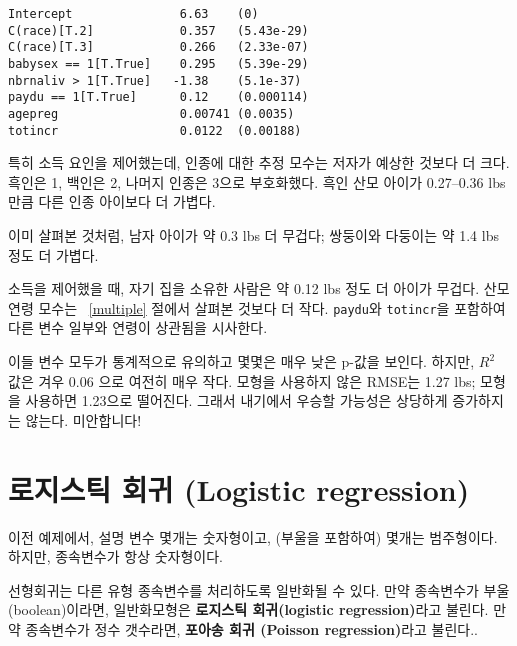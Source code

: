 \begin{verbatim}
Intercept               6.63    (0)
C(race)[T.2]            0.357   (5.43e-29)
C(race)[T.3]            0.266   (2.33e-07)
babysex == 1[T.True]    0.295   (5.39e-29)
nbrnaliv > 1[T.True]   -1.38    (5.1e-37)
paydu == 1[T.True]      0.12    (0.000114)
agepreg                 0.00741 (0.0035)
totincr                 0.0122  (0.00188)
\end{verbatim}

특히 소득 요인을 제어했는데, 인종에 대한 추정 모수는 저자가 예상한 것보다 더 크다. 흑인은 1, 백인은 2, 나머지 인종은 3으로 부호화했다.
흑인 산모 아이가 0.27--0.36 lbs 만큼 다른 인종 아이보다 더 가볍다.

이미 살펴본 것처럼, 남자 아이가 약 0.3 lbs 더 무겁다;
쌍둥이와 다둥이는 약 1.4 lbs 정도 더 가볍다.

소득을 제어했을 때, 자기 집을 소유한 사람은 약 0.12 lbs 정도 더 아이가 무겁다. 산모 연령 모수는 ~\ref{multiple} 절에서 살펴본 것보다 더 작다. {\tt paydu}와 {\tt totincr}을 포함하여 다른 변수 일부와 연령이 상관됨을 시사한다.

이들 변수 모두가 통계적으로 유의하고 몇몇은 매우 낮은 p-값을 보인다. 하지만, $R^2$ 값은 겨우 0.06 으로 여전히 매우 작다.
모형을 사용하지 않은 RMSE는 1.27 lbs; 모형을 사용하면 1.23으로 떨어진다.
그래서 내기에서 우승할 가능성은 상당하게 증가하지는 않는다. 미안합니다!


\section{로지스틱 회귀 (Logistic regression)}

이전 예제에서, 설명 변수 몇개는 숫자형이고, (부울을 포함하여) 몇개는 범주형이다. 하지만, 종속변수가 항상 숫자형이다.


선형회귀는 다른 유형 종속변수를 처리하도록 일반화될 수 있다.
만약 종속변수가 부울(boolean)이라면, 일반화모형은 {\bf 로지스틱 회귀(logistic regression)}라고 불린다. 만약 종속변수가 정수 갯수라면, {\bf 포아송 회귀 (Poisson regression)}라고 불린다..

